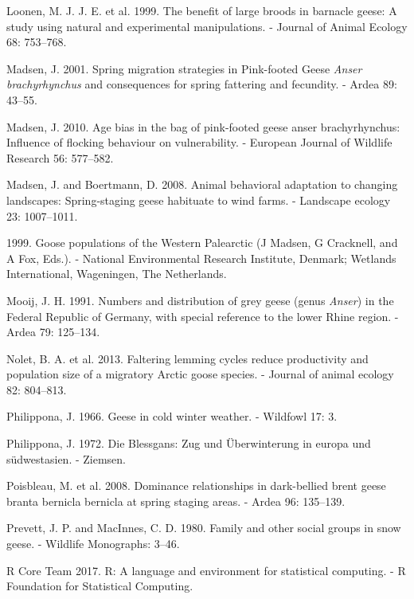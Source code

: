 \documentclass[10pt,twocolumn]{paper}
\begin{document}
\hypertarget{ref-JANE:JANE325}{}
Loonen, M. J. J. E. et al. 1999. The benefit of large broods in barnacle
geese: A study using natural and experimental manipulations. - Journal
of Animal Ecology 68: 753--768.

\hypertarget{ref-madsen2001spring}{}
Madsen, J. 2001. Spring migration strategies in Pink-footed Geese
\emph{Anser brachyrhynchus} and consequences for spring fattering and
fecundity. - Ardea 89: 43--55.

\hypertarget{ref-Madsen2010}{}
Madsen, J. 2010. Age bias in the bag of pink-footed geese anser
brachyrhynchus: Influence of flocking behaviour on vulnerability. -
European Journal of Wildlife Research 56: 577--582.

\hypertarget{ref-madsen2008animal}{}
Madsen, J. and Boertmann, D. 2008. Animal behavioral adaptation to
changing landscapes: Spring-staging geese habituate to wind farms. -
Landscape ecology 23: 1007--1011.

\hypertarget{ref-madsen1999goose}{}
1999. Goose populations of the Western Palearctic (J Madsen, G
Cracknell, and A Fox, Eds.). - National Environmental Research
Institute, Denmark; Wetlands International, Wageningen, The Netherlands.

\hypertarget{ref-mooij1991numbers}{}
Mooij, J. H. 1991. Numbers and distribution of grey geese (genus
\emph{Anser}) in the Federal Republic of Germany, with special reference
to the lower Rhine region. - Ardea 79: 125--134.

\hypertarget{ref-nolet2013faltering}{}
Nolet, B. A. et al. 2013. Faltering lemming cycles reduce productivity
and population size of a migratory Arctic goose species. - Journal of
animal ecology 82: 804--813.

\hypertarget{ref-philippona1966geese}{}
Philippona, J. 1966. Geese in cold winter weather. - Wildfowl 17: 3.

\hypertarget{ref-philippona1972blessgans}{}
Philippona, J. 1972. Die Blessgans: Zug und Überwinterung in europa und
südwestasien. - Ziemsen.

\hypertarget{ref-poisbleau2008dominance}{}
Poisbleau, M. et al. 2008. Dominance relationships in dark-bellied brent
geese branta bernicla bernicla at spring staging areas. - Ardea 96:
135--139.

\hypertarget{ref-prevett1980snow}{}
Prevett, J. P. and MacInnes, C. D. 1980. Family and other social groups
in snow geese. - Wildlife Monographs: 3--46.

\hypertarget{ref-R}{}
R Core Team 2017. R: A language and environment for statistical
computing. - R Foundation for Statistical Computing.
\end{document}
